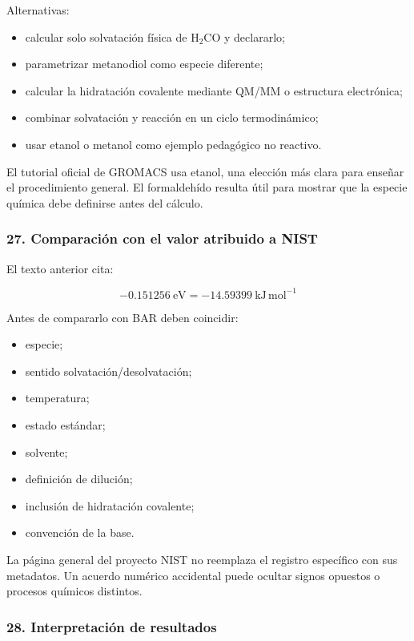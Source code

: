 \documentclass[
  spanish,
  11pt,
  a4paper]{article}
\providecommand{\tightlist}{%
  \setlength{\itemsep}{0pt}\setlength{\parskip}{0pt}}
\begin{document}
Alternativas:

\begin{itemize}
\tightlist
\item
  calcular solo solvatación física de \(\mathrm{H_2CO}\) y declararlo;
\item
  parametrizar metanodiol como especie diferente;
\item
  calcular la hidratación covalente mediante QM/MM o estructura
  electrónica;
\item
  combinar solvatación y reacción en un ciclo termodinámico;
\item
  usar etanol o metanol como ejemplo pedagógico no reactivo.
\end{itemize}

El tutorial oficial de GROMACS usa etanol, una elección más clara para
enseñar el procedimiento general. El formaldehído resulta útil para
mostrar que la especie química debe definirse antes del cálculo.

\subsubsection{27. Comparación con el valor atribuido a
NIST}\label{comparaciuxf3n-con-el-valor-atribuido-a-nist}

El texto anterior cita:

\[
-0.151256\ \mathrm{eV}
=
-14.59399\ \mathrm{kJ\,mol^{-1}}
\]

Antes de compararlo con BAR deben coincidir:

\begin{itemize}
\tightlist
\item
  especie;
\item
  sentido solvatación/desolvatación;
\item
  temperatura;
\item
  estado estándar;
\item
  solvente;
\item
  definición de dilución;
\item
  inclusión de hidratación covalente;
\item
  convención de la base.
\end{itemize}

La página general del proyecto NIST no reemplaza el registro específico
con sus metadatos. Un acuerdo numérico accidental puede ocultar signos
opuestos o procesos químicos distintos.

\subsubsection{28. Interpretación de
resultados}\label{interpretaciuxf3n-de-resultados}
\end{document}
